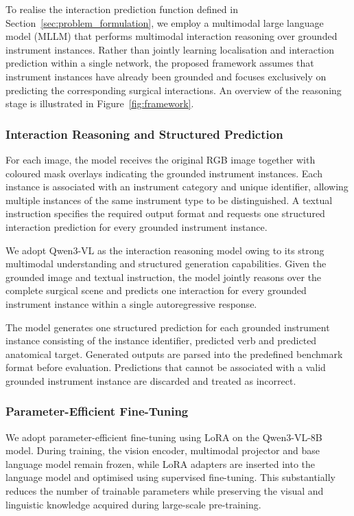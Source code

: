 \documentclass[11pt]{article}
\newcommand{\secref}[1]{Section~\ref{#1}}
\begin{document}
To realise the interaction prediction function defined in \secref{sec:problem_formulation}, we employ a multimodal large language model (MLLM) that performs multimodal interaction reasoning over grounded instrument instances. Rather than jointly learning localisation and interaction prediction within a single network, the proposed framework assumes that instrument instances have already been grounded and focuses exclusively on predicting the corresponding surgical interactions. An overview of the reasoning stage is illustrated in Figure~\ref{fig:framework}.

\subsubsection{Interaction Reasoning and Structured Prediction}
For each image, the model receives the original RGB image together with coloured mask overlays indicating the grounded instrument instances. Each instance is associated with an instrument category and unique identifier, allowing multiple instances of the same instrument type to be distinguished. A textual instruction specifies the required output format and requests one structured interaction prediction for every grounded instrument instance.

We adopt Qwen3-VL as the interaction reasoning model owing to its strong multimodal understanding and structured generation capabilities. Given the grounded image and textual instruction, the model jointly reasons over the complete surgical scene and predicts one interaction for every grounded instrument instance within a single autoregressive response.

The model generates one structured prediction for each grounded instrument instance consisting of the instance identifier, predicted verb and predicted anatomical target. Generated outputs are parsed into the predefined benchmark format before evaluation. Predictions that cannot be associated with a valid grounded instrument instance are discarded and treated as incorrect.

\subsubsection{Parameter-Efficient Fine-Tuning}
We adopt parameter-efficient fine-tuning using LoRA on the Qwen3-VL-8B model. During training, the vision encoder, multimodal projector and base language model remain frozen, while LoRA adapters are inserted into the language model and optimised using supervised fine-tuning. This substantially reduces the number of trainable parameters while preserving the visual and linguistic knowledge acquired during large-scale pre-training.
\end{document}
